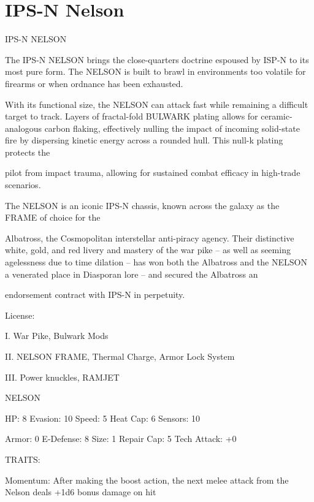 \section{IPS-N Nelson}

                                              IPS-N NELSON

The IPS-N NELSON brings the close-quarters doctrine espoused by ISP-N to its most pure form. The
NELSON is built to brawl in environments too volatile for firearms or when ordnance has been exhausted.

With its functional size, the NELSON can attack fast while remaining a difficult target to track. Layers of
fractal-fold BULWARK plating allows for ceramic-analogous carbon flaking, effectively nulling the impact of
incoming solid-state fire by dispersing kinetic energy across a rounded hull. This null-k plating protects the

pilot from impact trauma, allowing for sustained combat efficacy in high-trade scenarios.

The NELSON is an iconic IPS-N chassis, known across the galaxy as the FRAME of choice for the

Albatross, the Cosmopolitan interstellar anti-piracy agency. Their distinctive white, gold, and red livery and
mastery of the war pike -- as well as seeming agelessness due to time dilation -- has won both the
Albatross and the NELSON a venerated place in Diasporan lore -- and secured the Albatross an

endorsement contract with IPS-N in perpetuity.

                                                     License:

I. War Pike, Bulwark Mods

II. NELSON FRAME, Thermal Charge, Armor Lock System

III. Power knuckles, RAMJET


                                                    NELSON

  HP: 8           Evasion: 10                            Speed: 5            Heat Cap: 6        Sensors: 10

  Armor: 0        E-Defense: 8                           Size: 1             Repair Cap: 5      Tech Attack:
                                                                                                +0

                                                     TRAITS:

  Momentum: After making the boost action, the next melee attack from the Nelson deals +1d6 bonus
  damage on hit

